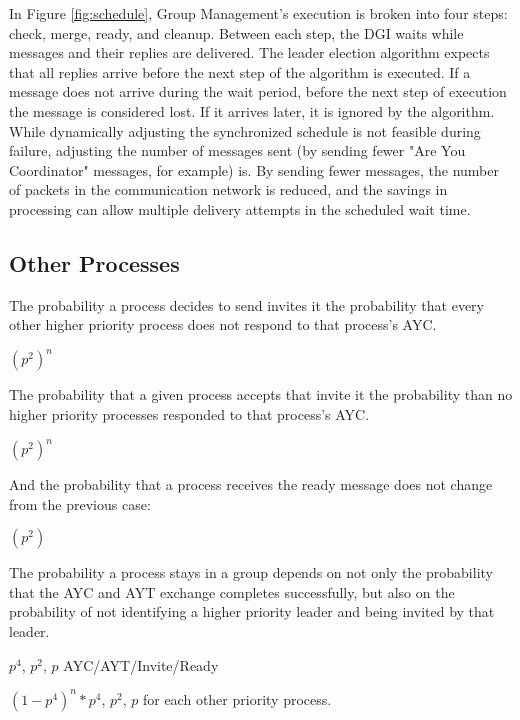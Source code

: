 In Figure \ref{fig:schedule}, Group Management's execution is broken into four steps: check, merge, ready, and cleanup.
Between each step, the DGI waits while messages and their replies are delivered.
The leader election algorithm expects that all replies arrive before the next step of the algorithm is executed.
If a message does not arrive during the wait period, before the next step of execution the message is considered lost.
If it arrives later, it is ignored by the algorithm.
While dynamically adjusting the synchronized schedule is not feasible during failure, adjusting the number of messages sent (by sending fewer "Are You Coordinator" messages, for example) is.
By sending fewer messages, the number of packets in the communication network is reduced, and the savings in processing can allow multiple delivery attempts in the scheduled wait time.

\subsection{Other Processes}

The probability a process decides to send invites it the probability that every other higher priority process does not respond to that process's \ac{AYC}.

$(p^2)^n$

The probability that a given process accepts that invite it the probability than no higher priority processes responded to that process's AYC.

$(p^2)^n$

And the probability that a process receives the ready message does not change from the previous case:

$(p^2)$

The probability a process stays in a group depends on not only the probability that the \ac{AYC} and \ac{AYT} exchange completes successfully, but also on the probability of not identifying a higher priority leader and being invited by that leader.

$p^4$, $p^2$, $p$ AYC/AYT/Invite/Ready

$(1-p^4)^n * p^4$, $p^2$, $p$ for each other priority process.

